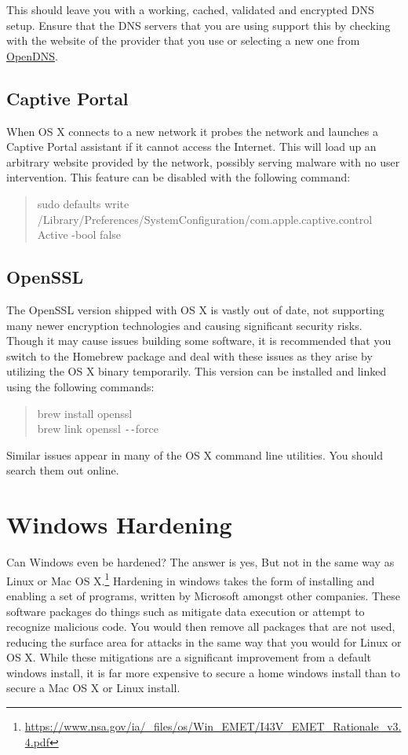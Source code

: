 \documentclass[a4paper,11pt]{report}
\begin{document}
				This should leave you with a working, cached, validated and encrypted DNS setup. 
				Ensure that the DNS servers that you are using support this by checking with the website of the provider that you use or 
				selecting a new one from \href{https://www.opendns.com/}{OpenDNS}.
				
			\subsection{Captive Portal}
				When OS X connects to a new network it probes the network and launches a Captive Portal assistant if it cannot access the Internet. 
				This will load up an arbitrary website provided by the network, possibly serving malware with no user intervention. 
				This feature can be disabled with the following command:
				\begin{quote}
					sudo defaults write /Library/Preferences/SystemConfiguration/com.apple.captive.control Active -bool false
				\end{quote}

			\subsection{OpenSSL}
				The OpenSSL version shipped with OS X is vastly out of date, not supporting many newer encryption technologies and causing significant security risks. 
				Though it may cause issues building some software, it is recommended that you switch to the Homebrew package and deal with these issues as they arise by utilizing the OS X binary temporarily.
				This version can be installed and linked using the following commands:
				\begin{quote}
					brew install openssl \\
					brew link openssl \verb+--+force
				\end{quote}
				Similar issues appear in many of the OS X command line utilities. 
				You should search them out online. 
	\section{Windows Hardening}
		Can Windows even be hardened? The answer is yes, But not in the same way as Linux or Mac OS X.\footnote{\url{https://www.nsa.gov/ia/\_files/os/Win\_EMET/I43V\_EMET\_Rationale\_v3.4.pdf}}
		Hardening in windows takes the form of installing and enabling a set of programs, written by Microsoft amongst other companies. 
		These software packages do things such as mitigate data execution or attempt to recognize malicious code. 
		You would then remove all packages that are not used, reducing the surface area for attacks in the same way that you would for Linux or OS X. 
		While these mitigations are a significant improvement from a default windows install, it is far more expensive to secure a home windows install than to secure a Mac OS X or Linux install. 
\end{document}
